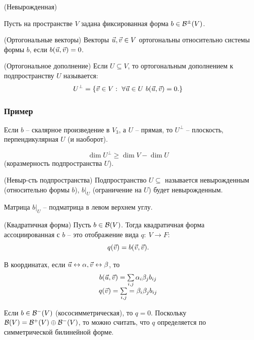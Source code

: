\begin{multicols}{2}
\begin{definition}{(Невырожденная)}{}
\end{definition}
Пусть на пространстве $V$ задана фиксированная форма $b \in \mathcal{B}^{\pm} (V)$.
\begin{definition}{(Ортогональные векторы)}{}
    Векторы $\vec{u}, \vec{v} \in V$ ортогональны относительно системы формы $b$, если $b(\vec{u}, \vec{v}) = 0$.
\end{definition}
\begin{definition}{(Ортогональное дополнение)}{}
    Если $U \subseteq V$, то ортогональным дополнением к подпространству $U$ называется:
    \[
        U^\perp = \{\vv \in V: \ \forall \vvu \in U \ b(\vvu, \vv) = 0.\}  
    \]
\end{definition}
\subsubsection*{Пример} Если $b$ -- скалярное произведение в $V_3$, а $U$ -- прямая, то $U^{\perp}$ -- плоскость, перпендикулярная $U$ (и наоборот).
\begin{proposition}{}{}
    \[
        \dim U^\perp \geq \dim V - \dim U  
    \]
    (коразмерность подпространства $U$).
\end{proposition}
\begin{definition}{(Невыр-сть подпространства)}{}
    Подпространство $U \subseteq$ называется невырожденным (относительно формы $b$), $b\big|_{U}$ (ограничение на $U$) будет невырожденным.
\end{definition}
\begin{note}{}{}
    Матрица $b\big|_{U}$ -- подматрица в левом верхнем углу.
\end{note}
\begin{definition}{(Квадратичная форма)}{}
    Пусть $b\in \mathcal{B}(V)$. Тогда квадратичная форма ассоциированная с $b$ -- это отображение вида $q: \ V \to F$:
    \[
        q(\vec{v}) = b(\vec{v}, \vec{v}).
        \]
\end{definition}
\begin{note}{}{}
    В координатах, если $\vec{u}\leftrightarrow \alpha , \vec{v} \leftrightarrow \beta$, то
    \[
        \begin{array}{c}
            b(\vec{u}, \vec{v}) = \sum\limits_{i,j} \alpha_i \beta_j b_{ij}\\
            q(\vec{v}) = \sum\limits_{i,j} = \beta_i \beta_jb_{ij}            
        \end{array}
    \]
\end{note}
Если $b \in \mathcal{B}^-(V)$ (кососимметрическая), то $q=0$. Поскольку $\mathcal{B}(V) = \mathcal{B}^+(V) \oplus \mathcal{B}^-(V)$, то можно считать, что $q$ определяется по симметрической билинейной форме. 

\end{multicols}
